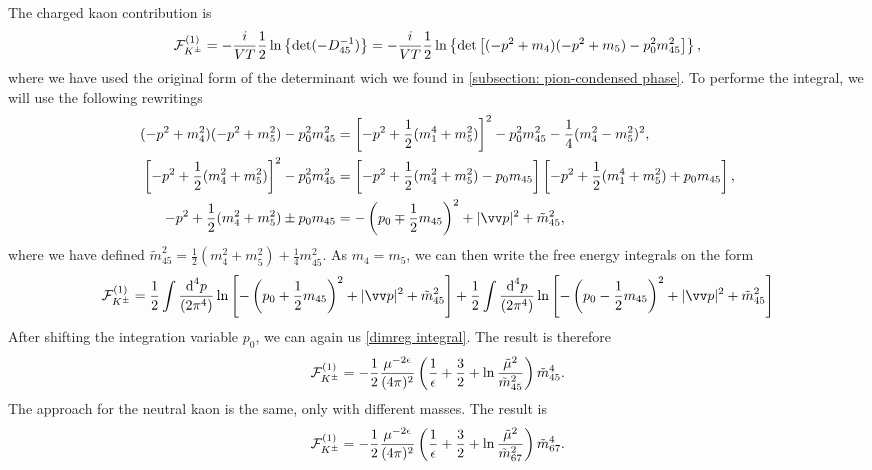 The charged kaon contribution is
%
\begin{equation}
    \mathcal{F}^{(1)}_{{K^\pm}}
    =
    -\frac{i}{VT}\frac{1}{2}
    \ln\left\{ 
        \det(-D_{45}^{-1})
    \right\}
    =
    -\frac{i}{VT}\frac{1}{2}
    \ln\left\{ 
        \det\left[(- p^2 + m_4)(- p^2 + m_5) - p_0^2m_{45}^2\right]
    \right\},
\end{equation}
%
where we have used the original form of the determinant wich we found in \autoref{subsection: pion-condensed phase}.
To performe the integral, we will use the following rewritings
%
\begin{align}
    (-p^2 + m_4^2)(-p^2 + m_5^2) - p_0^2 m_{45}^2
    &
    = \left[-p^2 + \frac{1}{2}(m_1^4 + m_5^2)\right]^2 
    - p_0^2 m_{45}^2 - \frac{1}{4}(m_4^2 - m_5^2)^2, \\
    \left[-p^2 + \frac{1}{2}(m_4^2 + m_5^2)\right]^2 - p_0^2 m_{45}^2
    &
    = \left[-p^2 + \frac{1}{2}(m_4^2 + m_5^2) - p_0 m_{45} \right]
    \left[-p^2 + \frac{1}{2}(m_1^4 + m_5^2) + p_0 m_{45} \right], \\
    - p^2 + \frac{1}{2}(m_4^2 + m_5^2) \pm p_0 m_{45}
    &= - \left(p_0 \mp \frac{1}{2}m_{45}\right)^2 + |\vv p|^2 
    + 
    \tilde m_{45}^2, 
\end{align}
%
where we have defined 
$
\tilde m_{45}^2 = \frac{1}{2}(m_4^2 + m_5^2) + \frac{1}{4} m_{45}^2.
$
As $m_4 = m_5$, we can then write the free energy integrals on the form
%
\begin{equation} 
    \nonumber
    \Eff_\Kpm^{(1)}
    =
    \frac{1}{2} \int \frac{\dd^4 p}{(2\pi^4)}
    \ln \left[
        - \left(p_0 + \frac{1}{2}m_{45}\right)^2 
        + |\vv p|^2 
        + \tilde m_{45}^2 
    \right]
    +
    \frac{1}{2}
    \int \frac{\dd^4 p}{(2\pi^4)}
    \ln \left[
        - \left(p_0 - \frac{1}{2}m_{45}\right)^2 
        + |\vv p|^2 
        + \tilde m_{45}^2 
    \right]
\end{equation}
%
After shifting the integration variable $p_0$, we can again us \autoref{dimreg integral}.
The result is therefore
%
\begin{equation}
    \mathcal{F}_{K^\pm}^{(1)}
    =
    - \frac{1}{2} \frac{\mu^{-2 \epsilon} }{(4\pi)^2} 
    \left(
        \frac{1}{\epsilon} + \frac{3}{2} + \ln \frac{\tilde \mu^2}{\tilde m_{45}^2}
    \right)\tilde m_{45}^4.
\end{equation}
%
The approach for the neutral kaon is the same, only with different masses.
The result is
%
\begin{equation}
    \mathcal{F}_{K^\pm}^{(1)}
    =
    - \frac{1}{2} \frac{ \mu^{-2 \epsilon}}{(4\pi)^2} 
    \left(
        \frac{1}{\epsilon} + \frac{3}{2} + \ln \frac{\tilde \mu^2}{\tilde m_{67}^2}
    \right)\tilde m_{67}^4.
\end{equation}

